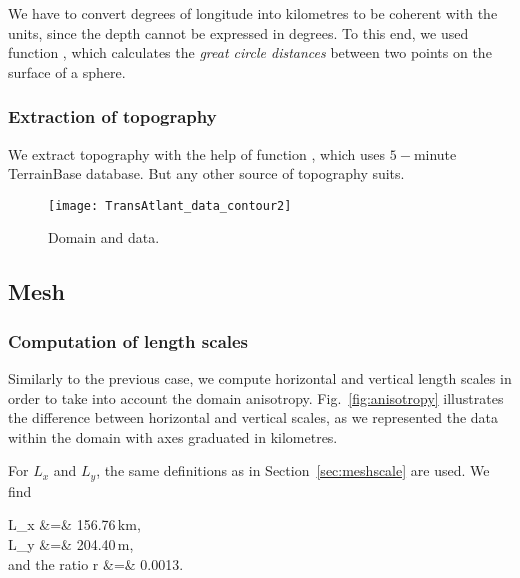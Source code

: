 We have to convert degrees of longitude into kilometres to be coherent with the units, since the depth cannot be expressed in degrees. To this end, we used \matlab function , which calculates the \textit{great circle distances} between two points on the surface of a sphere.  

\subsubsection{Extraction of topography}

We extract topography with the help of \matlab function  , which uses $5-$minute TerrainBase database. But any other source of topography suits.
				
\begin{figure}[H]
\centering
\texttt{[image: TransAtlant\_data\_contour2]}
\caption{Domain and data.\label{fig:domaindata}}
\end{figure}


%
%

\subsection{Mesh} 

\subsubsection{Computation of length scales}

Similarly to the previous case, we compute horizontal and vertical length scales in order to take into account the domain anisotropy. Fig.~\ref{fig:anisotropy} illustrates the difference between horizontal and vertical scales, as we represented the data within the domain with axes graduated in kilometres.

For $L_x$ and $L_y$, the same definitions as in Section~\ref{sec:meshscale} are used. We find

\beqn
L_x &=& 156.76\,km, \\
L_y &=& 204.40\,m, \\
\textrm{and the ratio\qquad} r &=&  0.0013.
\eeqn

